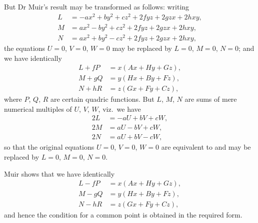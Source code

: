 \documentclass[11pt,a4paper]{article}
\theoremstyle{plain}
\begin{document}
But Dr Muir's result may be transformed as follows: writing
\begin{align*}
L &= -ax^2 + by^2 + cz^2 + 2fyz + 2gzx + 2hxy, \\
M &= ax^2 - by^2 + cz^2 + 2fyz + 2gzx + 2hxy, \\
N &= ax^2 + by^2 - cz^2 + 2fyz + 2gzx + 2hxy,
\end{align*}
the equations $U = 0$, $V = 0$, $W = 0$ may be replaced by $L = 0$, $M = 0$, $N = 0$; and we have identically
\begin{align*}
L + fP &= x(Ax + Hy + Gz), \\
M + gQ &= y(Hx + By + Fz), \\
N + hR &= z(Gx + Fy + Cz),
\end{align*}
where $P$, $Q$, $R$ are certain quadric functions. But $L$, $M$, $N$ are sums of mere numerical multiples of $U$, $V$, $W$, viz.~we have
\begin{align*}
2L &= -aU + bV + cW, \\
2M &= aU - bV + cW, \\
2N &= aU + bV - cW,
\end{align*}
so that the original equations $U = 0$, $V = 0$, $W = 0$ are equivalent to and may be replaced by $L = 0$, $M = 0$, $N = 0$.

Muir shows that we have identically
\begin{align*}
L - fP &= x(Ax + Hy + Gz), \\
M - gQ &= y(Hx + By + Fz), \\
N - hR &= z(Gx + Fy + Cz),
\end{align*}
and hence the condition for a common point is obtained in the required form.

\newpage
\end{document}

